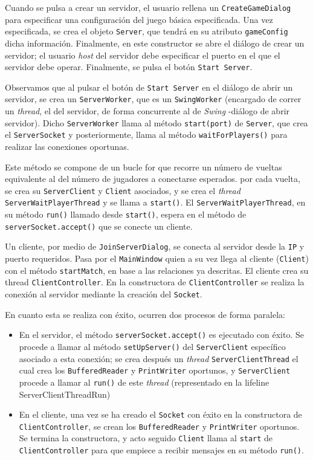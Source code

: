 \documentclass[../DocumentoOficial.tex]{subfiles}
\begin{document}
Cuando se pulsa a crear un servidor, el usuario rellena un \texttt{CreateGameDialog} para especificar una configuración del juego básica especificada. Una vez especificada, se crea el objeto \texttt{Server}, que tendrá en su atributo \texttt{gameConfig} dicha información. Finalmente, en este constructor se abre el diálogo de crear un servidor; el usuario \textit{host} del servidor debe especificar el puerto en el que el servidor debe operar. Finalmente, se pulsa el botón \texttt{Start Server}.

Observamos que al pulsar el botón de \texttt{Start Server} en el diálogo de abrir un servidor, se crea un \texttt{ServerWorker}, que es un \texttt{SwingWorker} (encargado de correr un \textit{thread}, el del servidor, de forma concurrente al de \textit{Swing} -diálogo de abrir servidor). Dicho \texttt{ServerWorker} llama al método \texttt{start(port)} de \texttt{Server}, que crea el \texttt{ServerSocket} y posteriormente, llama al método \texttt{waitForPlayers()} para realizar las conexiones oportunas.

Este método se compone de un bucle for que recorre un número de vueltas equivalente al del número de jugadores a conectarse esperados. por cada vuelta, se crea su \texttt{ServerClient} y \texttt{Client} asociados, y se crea el \textit{thread} \texttt{ServerWaitPlayerThread} y se llama a \texttt{start()}. El \texttt{ServerWaitPlayerThread}, en su método \texttt{run()} llamado desde \texttt{start()}, espera en el método de \texttt{serverSocket.accept()} que se conecte un cliente.

Un cliente, por medio de \texttt{JoinServerDialog}, se conecta al servidor desde la \texttt{IP} y puerto requeridos. Pasa por el \texttt{MainWindow} quien a su vez llega al cliente (\texttt{Client}) con el método \texttt{startMatch}, en base a las relaciones ya descritas. El cliente crea su thread \texttt{ClientController}. En la constructora de \texttt{ClientController} se realiza la conexión al servidor mediante la creación del \texttt{Socket}.

En cuanto esta se realiza con éxito, ocurren dos procesos de forma paralela:

\begin{itemize}
\item En el servidor, el método \texttt{serverSocket.accept()} es ejecutado con éxito. Se procede a llamar al método \texttt{setUpServer()} del \texttt{ServerClient} específico asociado a esta conexión; se crea después un \textit{thread} \texttt{ServerClientThread} el cual crea los \texttt{BufferedReader} y \texttt{PrintWriter} oportunos, y \texttt{ServerClient} procede a llamar al \texttt{run()} de este \textit{thread} (representado en la lifeline ServerClientThreadRun)

\item En el cliente, una vez se ha creado el \texttt{Socket} con éxito en la constructora de \texttt{ClientController}, se crean los \texttt{BufferedReader} y \texttt{PrintWriter} oportunos. Se termina la constructora, y acto seguido \texttt{Client} llama al \texttt{start} de \texttt{ClientController} para que empiece a recibir mensajes en su método \texttt{run()}.
\end{itemize}
\end{document}
